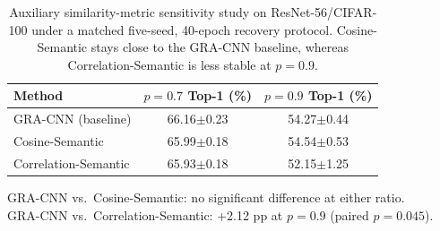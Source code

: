 \begin{table}[t]
\caption{Auxiliary similarity-metric sensitivity study on ResNet-56/CIFAR-100 under a matched five-seed, 40-epoch recovery protocol. Cosine-Semantic stays close to the GRA-CNN baseline, whereas Correlation-Semantic is less stable at $p=0.9$.}
\label{tab:metric_sensitivity_ivc}
\scriptsize
\begin{tabular*}{\linewidth}{@{\extracolsep\fill}lcc}
\toprule
Method & $p=0.7$ Top-1 (\%) & $p=0.9$ Top-1 (\%) \\
\midrule
GRA-CNN (baseline) & 66.16$\pm$0.23 & 54.27$\pm$0.44 \\
Cosine-Semantic & 65.99$\pm$0.18 & 54.54$\pm$0.53 \\
Correlation-Semantic & 65.93$\pm$0.18 & 52.15$\pm$1.25 \\
\bottomrule
\end{tabular*}
\vspace{0.25em}

\noindent\footnotesize
GRA-CNN vs.\ Cosine-Semantic: no significant difference at either ratio.\\
GRA-CNN vs.\ Correlation-Semantic: +2.12 pp at $p=0.9$ (paired $p=0.045$).
\end{table}
